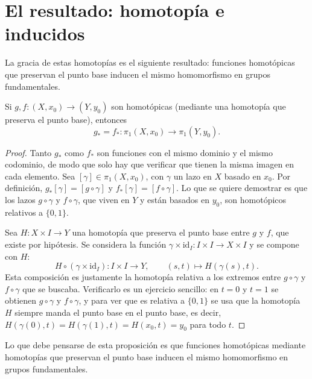 \documentclass[11pt]{article}
\begin{document}
\section*{El resultado: homotopía e inducidos}

La gracia de estas homotopías es el siguiente resultado: funciones homotópicas que preservan el punto base inducen el mismo homomorfismo en grupos fundamentales.

\begin{prop}\label{prop:homotopia-inducido}
Si $g,f\colon (X,x_0)\to(Y,y_0)$ son homotópicas (mediante una homotopía que preserva el punto base), entonces
\[
  g_*=f_*\colon\pi_1(X,x_0)\to\pi_1(Y,y_0).
\]
\end{prop}

\begin{proof}
Tanto $g_*$ como $f_*$ son funciones con el mismo dominio y el mismo codominio, de modo que solo hay que verificar que tienen la misma imagen en cada elemento. Sea $[\gamma]\in\pi_1(X,x_0)$, con $\gamma$ un lazo en $X$ basado en $x_0$. Por definición, $g_*[\gamma]=[g\circ\gamma]$ y $f_*[\gamma]=[f\circ\gamma]$. Lo que se quiere demostrar es que los lazos $g\circ\gamma$ y $f\circ\gamma$, que viven en $Y$ y están basados en $y_0$, son homotópicos relativos a $\{0,1\}$.

Sea $H\colon X\times I\to Y$ una homotopía que preserva el punto base entre $g$ y $f$, que existe por hipótesis. Se considera la función $\gamma\times\mathrm{id}_I\colon I\times I\to X\times I$ y se compone con $H$:
\[
  H\circ(\gamma\times\mathrm{id}_I)\colon I\times I\to Y,\qquad (s,t)\mapsto H(\gamma(s),t).
\]
Esta composición es justamente la homotopía relativa a los extremos entre $g\circ\gamma$ y $f\circ\gamma$ que se buscaba. Verificarlo es un ejercicio sencillo: en $t=0$ y $t=1$ se obtienen $g\circ\gamma$ y $f\circ\gamma$, y para ver que es relativa a $\{0,1\}$ se usa que la homotopía $H$ siempre manda el punto base en el punto base, es decir, $H(\gamma(0),t)=H(\gamma(1),t)=H(x_0,t)=y_0$ para todo $t$.
\end{proof}

Lo que debe pensarse de esta proposición es que funciones homotópicas mediante homotopías que preservan el punto base inducen el mismo homomorfismo en grupos fundamentales.

\begin{erratas}
\end{erratas}
\end{document}
